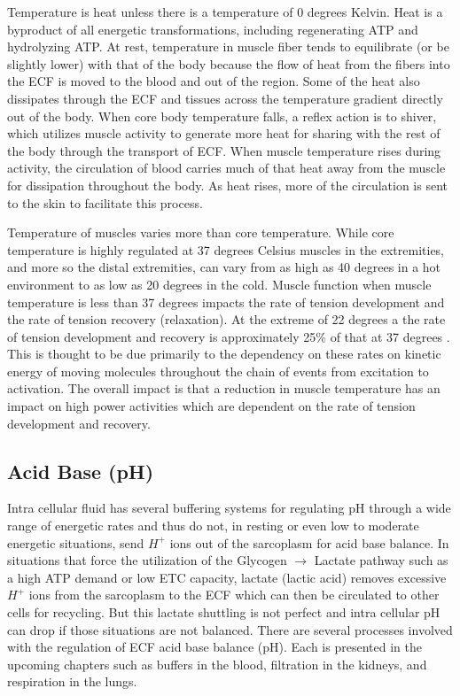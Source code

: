 Temperature is heat unless there is a temperature of 0 degrees Kelvin. Heat is a byproduct of all energetic transformations, including regenerating ATP and hydrolyzing ATP. At rest, temperature in muscle fiber tends to equilibrate (or be slightly lower) with that of the body because the flow of heat from the fibers into the ECF is moved to the blood and out of the region. Some of the heat also dissipates through the ECF and tissues across the temperature gradient directly out of the body. When core body temperature falls, a reflex action is to shiver, which utilizes muscle activity to generate more heat for sharing with the rest of the body through the transport of ECF. When muscle temperature rises during activity, the circulation of blood carries much of that heat away from the muscle for dissipation throughout the body. As heat rises, more of the circulation is sent to the skin to facilitate this process.

Temperature of muscles varies more than core temperature. While core temperature is highly regulated at 37 degrees Celsius muscles in the extremities, and more so the distal extremities, can vary from as high as 40 degrees in a hot environment to as low as 20 degrees in the cold. Muscle function when muscle temperature is less than 37 degrees impacts the rate of tension development and the rate of tension recovery (relaxation). At the extreme of 22 degrees a the rate of tension development and recovery is approximately 25\% of that at 37 degrees \cite{jones_skeletal_2006}. This is thought to be due primarily to the dependency on these rates on kinetic energy of moving molecules throughout the chain of events from excitation to activation. The overall impact is that a reduction in muscle temperature has an impact on high power activities which are dependent on the rate of tension development and recovery.

\subsection{Acid Base (pH)}

Intra cellular fluid has several buffering systems for regulating pH through a wide range of energetic rates and thus do not, in resting or even low to moderate energetic situations, send $H^+$ ions out of the sarcoplasm for acid base balance. In situations that force the utilization of the Glycogen $\rightarrow$ Lactate pathway such as a high ATP demand or low ETC capacity, lactate (lactic acid) removes excessive $H^+$ ions from the sarcoplasm to the ECF which can then be circulated to other cells for recycling. But this lactate shuttling is not perfect and intra cellular pH can drop if those situations are not balanced.
There are several processes involved with the regulation of ECF acid base balance (pH). Each is presented in the upcoming chapters such as buffers in the blood,  filtration in the kidneys, and respiration in the lungs.

